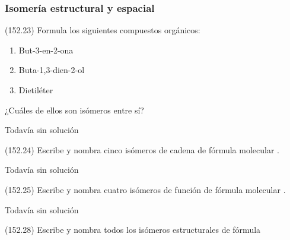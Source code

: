   \subsubsection*{Isomería estructural y espacial}

  \begin{exercise}[
      tags    = {},
      topics  = {química, química orgánica, orgánica},
      source  = {FQ 1B MGH 2016, p152, e23},
    ]
    (152.23) Formula los siguientes compuestos orgánicos:
    \begin{enumerate}
      \item But-3-en-2-ona
      \item Buta-1,3-dien-2-ol
      \item Dietiléter
    \end{enumerate}
    ¿Cuáles de ellos son isómeros entre sí?
  \end{exercise}

  \begin{solution}[print=false]
    Todavía sin solución
  \end{solution}




  \begin{exercise}[
      tags    = {},
      topics  = {química, química orgánica, orgánica},
      source  = {FQ 1B MGH 2016, p152, e24},
    ]
    (152.24) Escribe y nombra cinco isómeros de cadena de fórmula molecular .
  \end{exercise}

  \begin{solution}[print=false]
    Todavía sin solución
  \end{solution}




  \begin{exercise}[
      tags    = {},
      topics  = {química, química orgánica, orgánica},
      source  = {FQ 1B MGH 2016, p152, e25},
    ]
    (152.25) Escribe y nombra cuatro isómeros de función de fórmula molecular .
  \end{exercise}

  \begin{solution}[print=false]
    Todavía sin solución
  \end{solution}




  \begin{exercise}[
      tags    = {},
      topics  = {química, química orgánica, orgánica},
      source  = {FQ 1B MGH 2016, p152, e28},
    ]
    (152.28) Escribe y nombra todos los isómeros estructurales de fórmula 
  \end{exercise}

